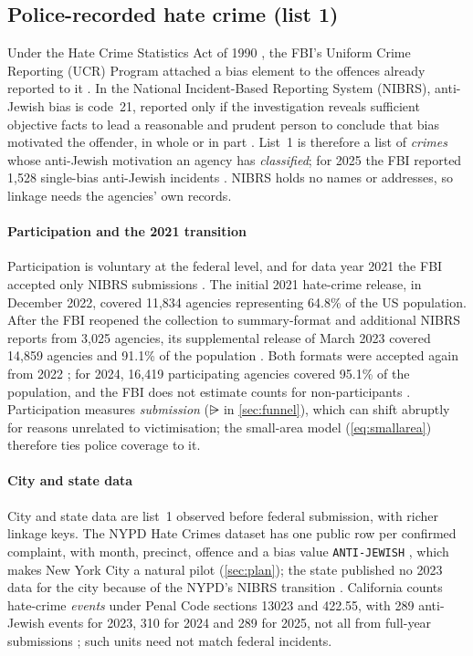 \subsection{Police-recorded hate crime (list 1)}\label{sec:src-police}

Under the Hate Crime Statistics Act of 1990 \citep{hcsa1990}, the FBI's Uniform Crime Reporting (UCR) Program attached a bias element to the offences already reported to it \citep{fbi2019about}. In the National Incident-Based Reporting System (NIBRS), anti-Jewish bias is code~21, reported only if the investigation reveals sufficient objective facts to lead a reasonable and prudent person to conclude that bias motivated the offender, in whole or in part \citep{fbimanual}. List~1 is therefore a list of \emph{crimes} whose anti-Jewish motivation an agency has \emph{classified}; for 2025 the FBI reported 1{,}528 single-bias anti-Jewish incidents \citep{fbi2026hate,adl2026fbi}. NIBRS holds no names or addresses, so linkage needs the agencies' own records.

\paragraph{Participation and the 2021 transition}
Participation is voluntary at the federal level, and for data year 2021 the FBI accepted only NIBRS submissions \citep{crs2025hate}. The initial 2021 hate-crime release, in December 2022, covered 11{,}834 agencies representing 64.8\% of the US population. After the FBI reopened the collection to summary-format and additional NIBRS reports from 3{,}025 agencies, its supplemental release of March 2023 covered 14{,}859 agencies and 91.1\% of the population \citep{fbi2023supp,doj2023hate2021}. Both formats were accepted again from 2022 \citep{crs2025hate}; for 2024, 16{,}419 participating agencies covered 95.1\% of the population, and the FBI does not estimate counts for non-participants \citep{fbi2025summary}. Participation measures \emph{submission} ($\rsub$ in \cref{sec:funnel}), which can shift abruptly for reasons unrelated to victimisation; the small-area model (\cref{eq:smallarea}) therefore ties police coverage to it.

\paragraph{City and state data}\label{sec:src-local}
City and state data are list~1 observed before federal submission, with richer linkage keys. The NYPD Hate Crimes dataset has one public row per confirmed complaint, with month, precinct, offence and a bias value \texttt{ANTI-JEWISH} \citep{nypdhate}, which makes New York City a natural pilot (\cref{sec:plan}); the state published no 2023 data for the city because of the NYPD's NIBRS transition \citep{osc2024hate}. California counts hate-crime \emph{events} under Penal Code sections 13023 and 422.55, with 289 anti-Jewish events for 2023, 310 for 2024 and 289 for 2025, not all from full-year submissions \citep{cadoj2025hate,cadoj2026hate}; such units need not match federal incidents.

